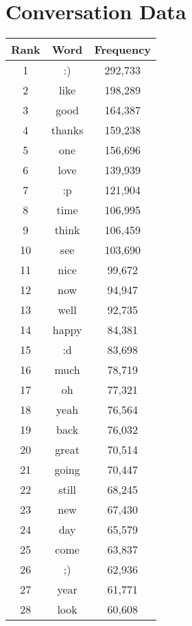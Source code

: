 \clearpage
\section{Conversation Data}
\label{sec:groups}

\clearpage
\begin{table}[!htbp]
\begin{minipage}[b]{.5\textwidth}
	\centering
	\begin{tabular}{|c|c|c|} %
		\hline
		\textbf{Rank} & \textbf{Word} & \textbf{Frequency}  \\ \hline
		1 & :) & 292,733 \\ \hline
		2 & like & 198,289 \\ \hline
		3 & good & 164,387 \\ \hline
		4 & thanks & 159,238 \\ \hline
		5 & one & 156,696 \\ \hline
		6 & love & 139,939 \\ \hline
		7 & :p & 121,904 \\ \hline
		8 & time & 106,995 \\ \hline
		9 & think & 106,459 \\ \hline
		10 & see & 103,690 \\ \hline
		11 & nice & 99,672 \\ \hline
		12 & now & 94,947 \\ \hline
		13 & well & 92,735 \\ \hline
		14 & happy & 84,381 \\ \hline
		15 & :d & 83,698 \\ \hline
		16 & much & 78,719 \\ \hline
		17 & oh & 77,321 \\ \hline
		18 & yeah & 76,564 \\ \hline
		19 & back & 76,032 \\ \hline
		20 & great & 70,514 \\ \hline
		21 & going & 70,447 \\ \hline
		22 & still & 68,245 \\ \hline
		23 & new & 67,430 \\ \hline
		24 & day & 65,579 \\ \hline
		25 & come & 63,837 \\ \hline
		26 & ;) & 62,936 \\ \hline
		27 & year & 61,771 \\ \hline
		28 & look & 60,608 \\ \hline

\end{tabular}
\end{minipage}
\end{table}
